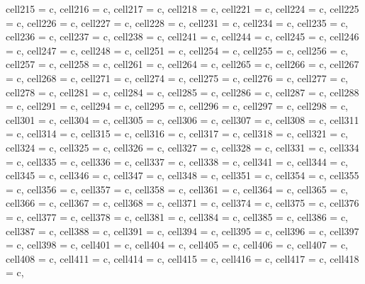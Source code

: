 {\begin{longtblr}[
  label = none,
  entry = none,
]
{  cell{21}{5} = {c},
  cell{21}{6} = {c},
  cell{21}{7} = {c},
  cell{21}{8} = {c},
  cell{22}{1} = {c},
  cell{22}{4} = {c},
  cell{22}{5} = {c},
  cell{22}{6} = {c},
  cell{22}{7} = {c},
  cell{22}{8} = {c},
  cell{23}{1} = {c},
  cell{23}{4} = {c},
  cell{23}{5} = {c},
  cell{23}{6} = {c},
  cell{23}{7} = {c},
  cell{23}{8} = {c},
  cell{24}{1} = {c},
  cell{24}{4} = {c},
  cell{24}{5} = {c},
  cell{24}{6} = {c},
  cell{24}{7} = {c},
  cell{24}{8} = {c},
  cell{25}{1} = {c},
  cell{25}{4} = {c},
  cell{25}{5} = {c},
  cell{25}{6} = {c},
  cell{25}{7} = {c},
  cell{25}{8} = {c},
  cell{26}{1} = {c},
  cell{26}{4} = {c},
  cell{26}{5} = {c},
  cell{26}{6} = {c},
  cell{26}{7} = {c},
  cell{26}{8} = {c},
  cell{27}{1} = {c},
  cell{27}{4} = {c},
  cell{27}{5} = {c},
  cell{27}{6} = {c},
  cell{27}{7} = {c},
  cell{27}{8} = {c},
  cell{28}{1} = {c},
  cell{28}{4} = {c},
  cell{28}{5} = {c},
  cell{28}{6} = {c},
  cell{28}{7} = {c},
  cell{28}{8} = {c},
  cell{29}{1} = {c},
  cell{29}{4} = {c},
  cell{29}{5} = {c},
  cell{29}{6} = {c},
  cell{29}{7} = {c},
  cell{29}{8} = {c},
  cell{30}{1} = {c},
  cell{30}{4} = {c},
  cell{30}{5} = {c},
  cell{30}{6} = {c},
  cell{30}{7} = {c},
  cell{30}{8} = {c},
  cell{31}{1} = {c},
  cell{31}{4} = {c},
  cell{31}{5} = {c},
  cell{31}{6} = {c},
  cell{31}{7} = {c},
  cell{31}{8} = {c},
  cell{32}{1} = {c},
  cell{32}{4} = {c},
  cell{32}{5} = {c},
  cell{32}{6} = {c},
  cell{32}{7} = {c},
  cell{32}{8} = {c},
  cell{33}{1} = {c},
  cell{33}{4} = {c},
  cell{33}{5} = {c},
  cell{33}{6} = {c},
  cell{33}{7} = {c},
  cell{33}{8} = {c},
  cell{34}{1} = {c},
  cell{34}{4} = {c},
  cell{34}{5} = {c},
  cell{34}{6} = {c},
  cell{34}{7} = {c},
  cell{34}{8} = {c},
  cell{35}{1} = {c},
  cell{35}{4} = {c},
  cell{35}{5} = {c},
  cell{35}{6} = {c},
  cell{35}{7} = {c},
  cell{35}{8} = {c},
  cell{36}{1} = {c},
  cell{36}{4} = {c},
  cell{36}{5} = {c},
  cell{36}{6} = {c},
  cell{36}{7} = {c},
  cell{36}{8} = {c},
  cell{37}{1} = {c},
  cell{37}{4} = {c},
  cell{37}{5} = {c},
  cell{37}{6} = {c},
  cell{37}{7} = {c},
  cell{37}{8} = {c},
  cell{38}{1} = {c},
  cell{38}{4} = {c},
  cell{38}{5} = {c},
  cell{38}{6} = {c},
  cell{38}{7} = {c},
  cell{38}{8} = {c},
  cell{39}{1} = {c},
  cell{39}{4} = {c},
  cell{39}{5} = {c},
  cell{39}{6} = {c},
  cell{39}{7} = {c},
  cell{39}{8} = {c},
  cell{40}{1} = {c},
  cell{40}{4} = {c},
  cell{40}{5} = {c},
  cell{40}{6} = {c},
  cell{40}{7} = {c},
  cell{40}{8} = {c},
  cell{41}{1} = {c},
  cell{41}{4} = {c},
  cell{41}{5} = {c},
  cell{41}{6} = {c},
  cell{41}{7} = {c},
  cell{41}{8} = {c},
}
\end{longtblr}}
